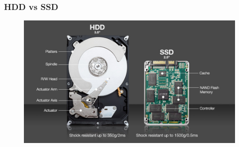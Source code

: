 \begin{frame}
	\frametitle{HDD vs SSD}
	  
	\begin{figure}[!htbp]
		\centering 
		\includegraphics[width=1.0\linewidth]{images/5_memory/hhd_vs_ssd.jpg}
	\end{figure}
\end{frame}

